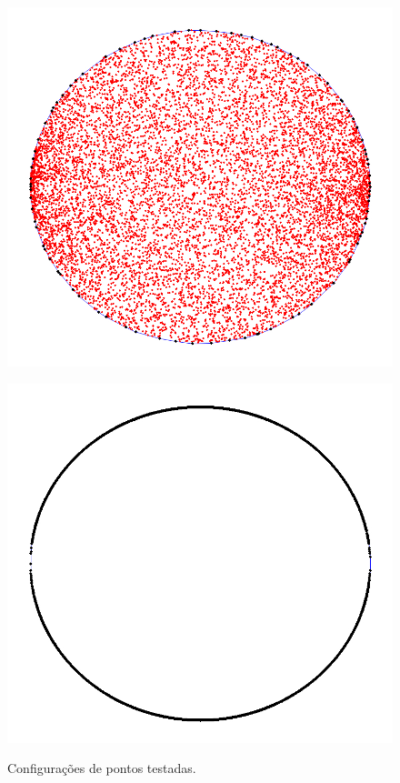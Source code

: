 \documentclass[11pt,a4paper]{article}
\begin{document}
\begin{figure}[!htb]
\begin{minipage}[b]{0.2\textwidth}
                \end{minipage}
              \begin{minipage}[b]{0.2\textwidth}
              \centering
                  \includegraphics[width=.8\linewidth]{inside_circle}
                  \label{fig:map}
                \end{minipage}
              \begin{minipage}[b]{0.2\textwidth}
              \centering
                  \includegraphics[width=.8\linewidth]{on_circle}
                  \label{fig:map}
                \end{minipage}
                \caption{Configurações de pontos testadas.}
        \end{figure}
\end{document}
